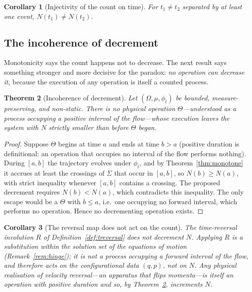 \documentclass[11pt,a4paper]{article}
\theoremstyle{thmstyle}
\newtheorem{theorem}{Theorem}[section]
\newtheorem{corollary}[theorem]{Corollary}
\theoremstyle{definition}
\theoremstyle{remark}
\newcommand{\Count}{N}
\newcommand{\Tinv}{R}
\newcommand{\flow}{\phi}
\begin{document}
\begin{corollary}[Injectivity of the count on time]
\label{cor:inject}
For $t_1\neq t_2$ separated by at least one event, $\Count(t_1)\neq
\Count(t_2)$.
\end{corollary}

\subsection{The incoherence of decrement}
\label{sec:incoherence}

Monotonicity says the count happens not to decrease. The next result says
something stronger and more decisive for the paradox: \emph{no operation
can decrease it}, because the execution of any operation is itself a
counted process.

\begin{theorem}[Incoherence of decrement]
\label{thm:incoherence}
Let $(\Omega,\mu,\flow_t)$ be bounded, measure-preserving, and non-static.
There is no physical operation $\Theta$---understood as a process
occupying a positive interval of the flow---whose execution leaves the
system with $\Count$ strictly smaller than before $\Theta$ began.
\end{theorem}

\begin{proof}
Suppose $\Theta$ begins at time $a$ and ends at time $b>a$ (positive
duration is definitional: an operation that occupies no interval of the
flow performs nothing). During $[a,b]$ the trajectory evolves under
$\flow_t$, and by Theorem~\ref{thm:monotone} it accrues at least the
crossings of $\Sigma$ that occur in $[a,b]$, so
$\Count(b)\geq\Count(a)$, with strict inequality whenever $[a,b]$
contains a crossing. The proposed decrement requires $\Count(b)<\Count(a)$,
which contradicts this inequality. The only escape would be a $\Theta$
with $b\leq a$, i.e.\ one occupying no forward interval, which performs no
operation. Hence no decrementing operation exists.
\end{proof}

\begin{corollary}[The reversal map does not act on the count]
\label{cor:Rnotcount}
The time-reversal involution $\Tinv$ of Definition~\ref{def:treversal}
does not decrement $\Count$. Applying $\Tinv$ is a substitution within the
solution set of the equations of motion
(Remark~\ref{rem:hinge}); it is not a process occupying a forward interval
of the flow, and therefore acts on the configurational data $(q,p)$, not
on $\Count$. Any \emph{physical} realisation of velocity reversal---an
apparatus that flips momenta---is itself an operation with positive
duration and so, by Theorem~\ref{thm:incoherence}, increments $\Count$.
\end{corollary}
\end{document}
